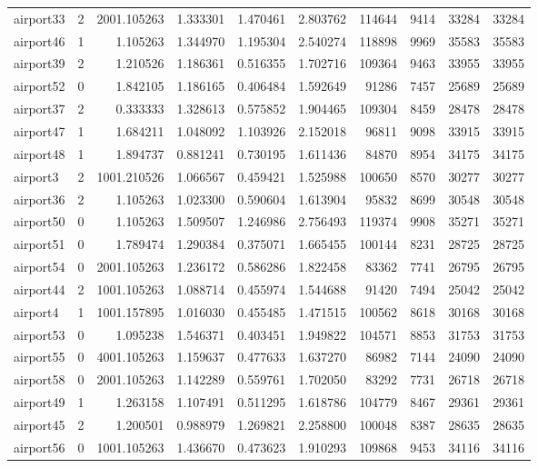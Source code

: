 \begin{longtable}{|l|r|r|r|r|r|r|r|r|r|}
airport33 & 2 & 2001.105263 & 1.333301 & 1.470461 & 2.803762 & 114644 & 9414 & 33284 & 33284 \\
airport46 & 1 & 1.105263 & 1.344970 & 1.195304 & 2.540274 & 118898 & 9969 & 35583 & 35583 \\
airport39 & 2 & 1.210526 & 1.186361 & 0.516355 & 1.702716 & 109364 & 9463 & 33955 & 33955 \\
airport52 & 0 & 1.842105 & 1.186165 & 0.406484 & 1.592649 & 91286 & 7457 & 25689 & 25689 \\
airport37 & 2 & 0.333333 & 1.328613 & 0.575852 & 1.904465 & 109304 & 8459 & 28478 & 28478 \\
airport47 & 1 & 1.684211 & 1.048092 & 1.103926 & 2.152018 & 96811 & 9098 & 33915 & 33915 \\
airport48 & 1 & 1.894737 & 0.881241 & 0.730195 & 1.611436 & 84870 & 8954 & 34175 & 34175 \\
airport3 & 2 & 1001.210526 & 1.066567 & 0.459421 & 1.525988 & 100650 & 8570 & 30277 & 30277 \\
airport36 & 2 & 1.105263 & 1.023300 & 0.590604 & 1.613904 & 95832 & 8699 & 30548 & 30548 \\
airport50 & 0 & 1.105263 & 1.509507 & 1.246986 & 2.756493 & 119374 & 9908 & 35271 & 35271 \\
airport51 & 0 & 1.789474 & 1.290384 & 0.375071 & 1.665455 & 100144 & 8231 & 28725 & 28725 \\
airport54 & 0 & 2001.105263 & 1.236172 & 0.586286 & 1.822458 & 83362 & 7741 & 26795 & 26795 \\
airport44 & 2 & 1001.105263 & 1.088714 & 0.455974 & 1.544688 & 91420 & 7494 & 25042 & 25042 \\
airport4 & 1 & 1001.157895 & 1.016030 & 0.455485 & 1.471515 & 100562 & 8618 & 30168 & 30168 \\
airport53 & 0 & 1.095238 & 1.546371 & 0.403451 & 1.949822 & 104571 & 8853 & 31753 & 31753 \\
airport55 & 0 & 4001.105263 & 1.159637 & 0.477633 & 1.637270 & 86982 & 7144 & 24090 & 24090 \\
airport58 & 0 & 2001.105263 & 1.142289 & 0.559761 & 1.702050 & 83292 & 7731 & 26718 & 26718 \\
airport49 & 1 & 1.263158 & 1.107491 & 0.511295 & 1.618786 & 104779 & 8467 & 29361 & 29361 \\
airport45 & 2 & 1.200501 & 0.988979 & 1.269821 & 2.258800 & 100048 & 8387 & 28635 & 28635 \\
airport56 & 0 & 1001.105263 & 1.436670 & 0.473623 & 1.910293 & 109868 & 9453 & 34116 & 34116 \\

\end{longtable}
